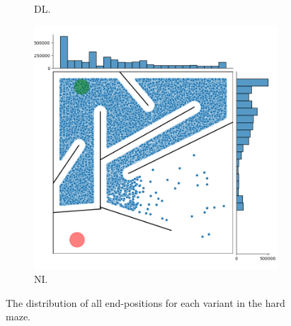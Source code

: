 \begin{figure}[H]
\begin{mdframed}
\begin{subfigure}[t]{0.5\textwidth}
            \caption{DL.}
        \end{subfigure}
        \begin{subfigure}[t]{0.5\textwidth}
            \includegraphics[scale=0.3]{resources/mazes/novelty_injection_hard.png}
            \caption{NI.}
        \end{subfigure}
    \end{mdframed}
    \caption{The distribution of all end-positions for each variant in the hard maze.}
    \label{distribution}
\end{figure}

